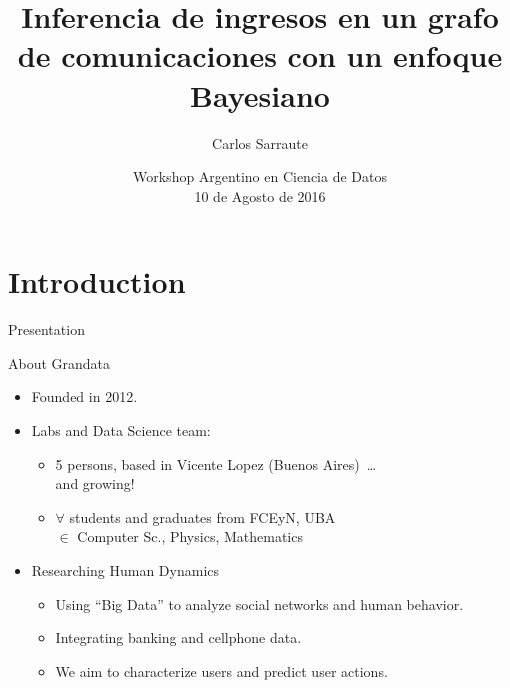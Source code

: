 \documentclass{beamer}
\title{Inferencia de ingresos en un grafo de comunicaciones con un enfoque Bayesiano}
\author{Carlos Sarraute
  }
\institute[]{%
  Grandata Labs 
  }
\date{Workshop Argentino en Ciencia de Datos \\ 10 de Agosto de 2016}
\begin{document}
\begin{frame}
\titlepage
\end{frame}



\section{Introduction}

\begin{frame}{Presentation}

\begin{block}{About Grandata}
\begin{itemize}

\item Founded in 2012.

\item Labs and Data Science team:
\begin{itemize}
\item 5 persons, based in Vicente Lopez (Buenos Aires)~\ldots \\ and growing!
\item $\forall$ students and graduates from FCEyN, UBA \\ $\in$ Computer Sc., Physics, Mathematics
\end{itemize}

\item Researching Human Dynamics
\begin{itemize}
\item Using ``Big Data'' to analyze social networks and human behavior.
\item Integrating banking and cellphone data.
\item We aim to characterize users and predict user actions.
\end{itemize}

\end{itemize}

\end{block}
\end{frame}
\end{document}
